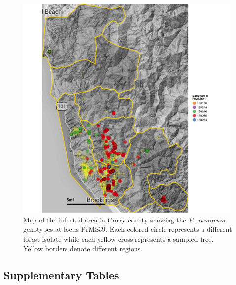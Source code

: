 \documentclass[double,12pt]{beavtex}
\begin{document}
  \begin{figure}
  
  {\centering \includegraphics[width=0.8\linewidth]{figure/phytopathology/figureS10} 
  
  }
  
  \caption[Map of the infected area in Curry county showing the \emph{P. ramorum}
  genotypes at locus PrMS39.]{Map of the infected area in Curry county showing the \emph{P. ramorum}
  genotypes at locus PrMS39. Each colored circle represents a different
  forest isolate while each yellow cross represents a sampled tree. Yellow
  borders denote different regions.}\label{fig:ramS10}
  \end{figure}
  
  \subsection{Supplementary Tables}\label{supplementary-tables}
  
\end{document}
